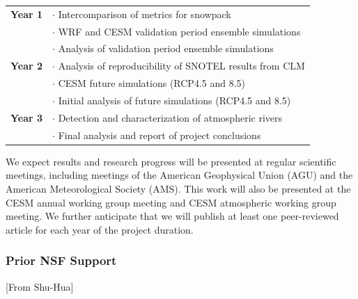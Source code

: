 \documentclass[11pt]{article}
\begin{document}
\begin{tabularx}{\textwidth}{cX}
\hline
\textbf{Year 1} & $\cdot$ Intercomparison of metrics for snowpack \\
& $\cdot$ WRF and CESM validation period ensemble simulations \\
& $\cdot$ Analysis of validation period ensemble simulations \\
\hline
\textbf{Year 2} & $\cdot$ Analysis of reproducibility of SNOTEL results from CLM \\
& $\cdot$ CESM future simulations (RCP4.5 and 8.5) \\
& $\cdot$ Initial analysis of future simulations (RCP4.5 and 8.5) \\
\hline
\textbf{Year 3} & $\cdot$ Detection and characterization of atmospheric rivers \\
& $\cdot$ Final analysis and report of project conclusions \\
\hline
\end{tabularx}

We expect results and research progress will be presented at regular scientific meetings, including meetings of the American Geophysical Union (AGU) and the American Meteorological Society (AMS). This work will also be presented at the CESM annual working group meeting and CESM atmospheric working group meeting. We further anticipate that we will publish at least one peer-reviewed article for each year of the project duration.

\subsubsection{Prior NSF Support}

{\color{red}[From Shu-Hua]}

  
{\vbox{}}
\end{document}
